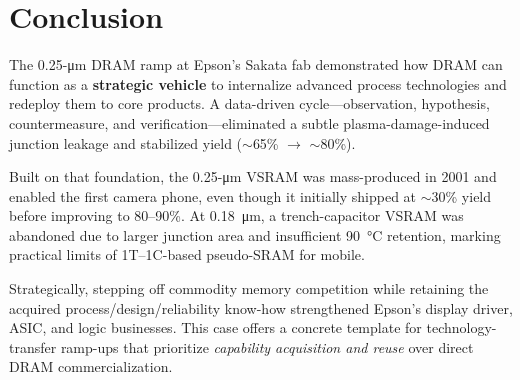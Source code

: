 \section{Conclusion}

The 0.25-\si{\micro\meter} DRAM ramp at Epson's Sakata fab demonstrated how DRAM can function as a \textbf{strategic vehicle} to internalize advanced process technologies and redeploy them to core products. A data-driven cycle—observation, hypothesis, countermeasure, and verification—eliminated a subtle plasma-damage-induced junction leakage and stabilized yield ($\sim$65\% $\rightarrow$ $\sim$80\%).

Built on that foundation, the 0.25-\si{\micro\meter} VSRAM was mass-produced in 2001 and enabled the first camera phone, even though it initially shipped at $\sim$30\% yield before improving to 80–90\%. At 0.18~\si{\micro\meter}, a trench-capacitor VSRAM was abandoned due to larger junction area and insufficient 90~\si{\celsius} retention, marking practical limits of 1T–1C-based pseudo-SRAM for mobile. 

Strategically, stepping off commodity memory competition while retaining the acquired process/design/reliability know-how strengthened Epson's display driver, ASIC, and logic businesses. This case offers a concrete template for technology-transfer ramp-ups that prioritize \emph{capability acquisition and reuse} over direct DRAM commercialization.
